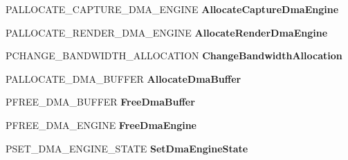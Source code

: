 \begin{DoxyCompactItemize}
\item 
\mbox{\label{struct___h_d_a_u_d_i_o___b_u_s___i_n_t_e_r_f_a_c_e_a938d011b7360cbfd97a8b2e632adfdc5}} 
P\+A\+L\+L\+O\+C\+A\+T\+E\+\_\+\+C\+A\+P\+T\+U\+R\+E\+\_\+\+D\+M\+A\+\_\+\+E\+N\+G\+I\+NE {\bfseries Allocate\+Capture\+Dma\+Engine}
\item 
\mbox{\label{struct___h_d_a_u_d_i_o___b_u_s___i_n_t_e_r_f_a_c_e_a212be648440407f2c2d35f866356b59c}} 
P\+A\+L\+L\+O\+C\+A\+T\+E\+\_\+\+R\+E\+N\+D\+E\+R\+\_\+\+D\+M\+A\+\_\+\+E\+N\+G\+I\+NE {\bfseries Allocate\+Render\+Dma\+Engine}
\item 
\mbox{\label{struct___h_d_a_u_d_i_o___b_u_s___i_n_t_e_r_f_a_c_e_aada356e6b817b18214a94eb74bde1976}} 
P\+C\+H\+A\+N\+G\+E\+\_\+\+B\+A\+N\+D\+W\+I\+D\+T\+H\+\_\+\+A\+L\+L\+O\+C\+A\+T\+I\+ON {\bfseries Change\+Bandwidth\+Allocation}
\item 
\mbox{\label{struct___h_d_a_u_d_i_o___b_u_s___i_n_t_e_r_f_a_c_e_ae5e7847e6b4d26eefac2117e56c3574b}} 
P\+A\+L\+L\+O\+C\+A\+T\+E\+\_\+\+D\+M\+A\+\_\+\+B\+U\+F\+F\+ER {\bfseries Allocate\+Dma\+Buffer}
\item 
\mbox{\label{struct___h_d_a_u_d_i_o___b_u_s___i_n_t_e_r_f_a_c_e_ad2ee6282112f6ab385a73f9b3bbbedd2}} 
P\+F\+R\+E\+E\+\_\+\+D\+M\+A\+\_\+\+B\+U\+F\+F\+ER {\bfseries Free\+Dma\+Buffer}
\item 
\mbox{\label{struct___h_d_a_u_d_i_o___b_u_s___i_n_t_e_r_f_a_c_e_aa6dc02e92cddb5aac36979651ed0fca0}} 
P\+F\+R\+E\+E\+\_\+\+D\+M\+A\+\_\+\+E\+N\+G\+I\+NE {\bfseries Free\+Dma\+Engine}
\item 
\mbox{\label{struct___h_d_a_u_d_i_o___b_u_s___i_n_t_e_r_f_a_c_e_a46b3ef4d9c2d6a071ec02e221780b61c}} 
P\+S\+E\+T\+\_\+\+D\+M\+A\+\_\+\+E\+N\+G\+I\+N\+E\+\_\+\+S\+T\+A\+TE {\bfseries Set\+Dma\+Engine\+State}
\item 
\mbox{\label{struct___h_d_a_u_d_i_o___b_u_s___i_n_t_e_r_f_a_c_e_aa209778378d94bd8f4504990468a124f}} 

\end{DoxyCompactItemize}
